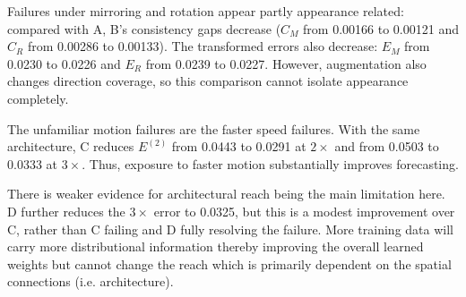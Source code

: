 Failures under mirroring and rotation appear partly appearance related: compared with A, B's consistency gaps decrease (\(C_M\) from 0.00166 to 0.00121 and \(C_R\) from 0.00286 to 0.00133). The transformed errors also decrease: \(E_M\) from 0.0230 to 0.0226 and \(E_R\) from 0.0239 to 0.0227. However, augmentation also changes direction coverage, so this comparison cannot isolate appearance completely.

The unfamiliar motion failures are the faster speed failures. With the same architecture, C reduces $E^{(2)}$ from 0.0443 to 0.0291 at $2\times$ and from 0.0503 to 0.0333 at $3\times$. Thus, exposure to faster motion substantially improves forecasting.

There is weaker evidence for architectural reach being the main limitation here. D further reduces the $3\times$ error to 0.0325, but this is a modest improvement over C, rather than C failing and D fully resolving the failure. More training data will carry more distributional information thereby improving the overall learned weights but cannot change the reach which is primarily dependent on the spatial connections (i.e. architecture).

